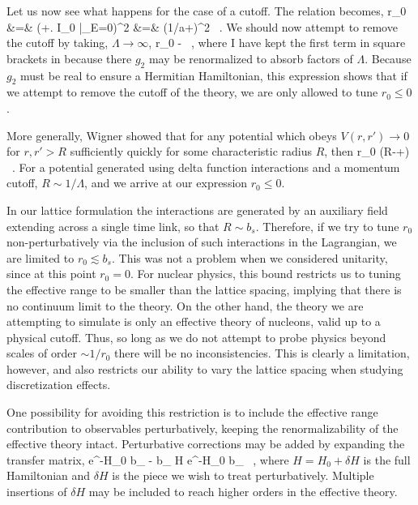 Let us now see what happens for the case of a cutoff. The relation becomes,
\beq
\label{eq:r0cutoff}
r_0 &=&  \left(+\left. I_0 \right|_{E=0}\right)^2  \cr
&=&  \left(1/a+\Lambda\right)^2  \ .
\eeq
We should now attempt to remove the cutoff by taking, $\Lambda \to \infty$,
\beq
r_0 \underset{\Lambda\to\infty}{\longrightarrow} - \ ,
\eeq
where I have kept the first term in square brackets in  because there $g_2$ may be renormalized to absorb factors of $\Lambda$. Because $g_2$ must be real to ensure a Hermitian Hamiltonian, this expression shows that if we attempt to remove the cutoff of the theory, we are only allowed to tune $r_0 \leq 0$. 

More generally, Wigner showed that for any potential which obeys $V(r,r') \to 0$ for $r,r'>R$ sufficiently quickly for some characteristic radius $R$, then
\beq
r_0 \left(R-+\right) \ .
\eeq
For a potential generated using delta function interactions and a momentum cutoff, $R\sim 1/\Lambda$, and we arrive at our expression $r_0\leq 0$.

In our lattice formulation the interactions are generated by an auxiliary field extending across a single time link, so that $R \sim b_s$. Therefore, if we try to tune $r_0$ non-perturbatively via the inclusion of such interactions in the Lagrangian, we are limited to $r_0 \lesssim b_s$. This was not a problem when we considered unitarity, since at this point $r_0 =0$. For nuclear physics, this bound restricts us to tuning the effective range to be smaller than the lattice spacing, implying that there is no continuum limit to the theory. On the other hand, the theory we are attempting to simulate is only an effective theory of nucleons, valid up to a physical cutoff. Thus, so long as we do not attempt to probe physics beyond scales of order $\sim 1/r_0$ there will be no inconsistencies. This is clearly a limitation, however, and also restricts our ability to vary the lattice spacing when studying discretization effects.

One possibility for avoiding this restriction is to include the effective range contribution to observables perturbatively, keeping the renormalizability of the effective theory intact. Perturbative corrections may be added by expanding the transfer matrix,
\beq
{} \approx e^{-H_0 b_{\tau}} - b_{\tau} \delta H e^{-H_0 b_{\tau}} \ ,
\eeq
where $H = H_0 + \delta H$ is the full Hamiltonian and $\delta H$ is the piece we wish to treat perturbatively. Multiple insertions of $\delta H$ may be included to reach higher orders in the effective theory.

